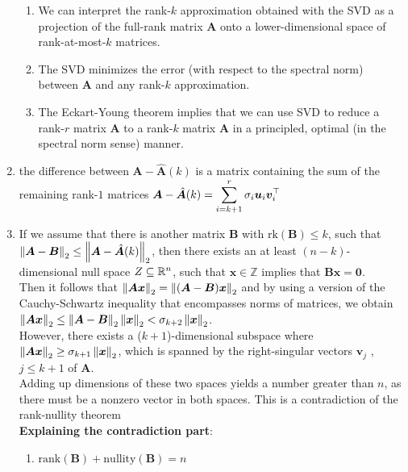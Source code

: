 \begin{enumerate}
\begin{enumerate}
        \item We can interpret the rank-$k$ approximation obtained with the SVD as a projection of the full-rank matrix $\bm{A}$ onto a lower-dimensional space of rank-at-most-$k$ matrices.
        \hfill \cite{mfml/book/mml/Deisenroth-Faisal-Ong}

        \item The SVD minimizes the error (with respect to the spectral norm) between $\bm{A}$ and any rank-$k$ approximation.
        \hfill \cite{mfml/book/mml/Deisenroth-Faisal-Ong}

        \item The Eckart-Young theorem implies that we can use SVD to reduce a rank-$r$ matrix $\bm{A}$ to a rank-$k$ matrix $\hat{\bm{A}}$ in a principled, optimal (in the spectral norm sense) manner. 
        \hfill \cite{mfml/book/mml/Deisenroth-Faisal-Ong}
    \end{enumerate}

    \item the difference between $\bm{A} - \hat{\bm{A}}(k)$ is a matrix containing the sum of the remaining rank-$1$ matrices
    $
        \bm{A} - \hat{\bm{A}}(k)
        = \displaystyle\sum_{i=k+1}^r \sigma_i \bm{u}_i \bm{v}_i^\top
    $
    \hfill \cite{mfml/book/mml/Deisenroth-Faisal-Ong}

    \item If we assume that there is another matrix $\bm{B}$ with $\text{rk}(\bm{B}) \leq k$, such that 
    $
        \left\| \bm{A} - \bm{B} \right\|_2 \leq \left\| \bm{A} - \hat{\bm{A}}(k) \right\|_2
    $,
    then there exists an at least $(n - k)$-dimensional null space $Z \subseteq \mathbb{R}^n$, such that $\bm{x} \in \mathbb{Z}$ implies that $\bm{Bx} = \bm{0}$. 
    \hfill \cite{mfml/book/mml/Deisenroth-Faisal-Ong}
    \\
    Then it follows that 
    $
        \left\| \bm{Ax} \right\|_2 = \left\| (\bm{A} - \bm{B})\bm{x} \right\|_2
    $
    and by using a version of the Cauchy-Schwartz inequality that encompasses norms of matrices, we obtain
    $
        \left\| \bm{Ax} \right\|_2 
        \leq \left\| \bm{A} - \bm{B} \right\|_2 \left\| \bm{x} \right\|_2
        < \sigma_{k+2} \left\| \bm{x} \right\|_2
    $.
    \hfill \cite{mfml/book/mml/Deisenroth-Faisal-Ong}
    \\
    However, there exists a ($k + 1$)-dimensional subspace where $\left\| \bm{Ax} \right\|_2 \geq \sigma_{k+1} \left\| \bm{x} \right\|_2$, which is spanned by the right-singular vectors $\bm{v}_j$ , $j \leq k + 1$ of $\bm{A}$.
    \\
    Adding up dimensions of these two spaces yields a number greater than $n$, as there must be a nonzero vector in both spaces. This is a contradiction of the rank-nullity theorem
    \hfill \cite{mfml/book/mml/Deisenroth-Faisal-Ong}
    \vspace{0.5cm}
    \\
    \textbf{Explaining the contradiction part}:
    \hfill \cite{common/online/chatgpt}
    \begin{enumerate}
        \item $\text{rank}(\bm{B})+\text{nullity}(\bm{B})=n$


\end{enumerate}
\end{enumerate}
